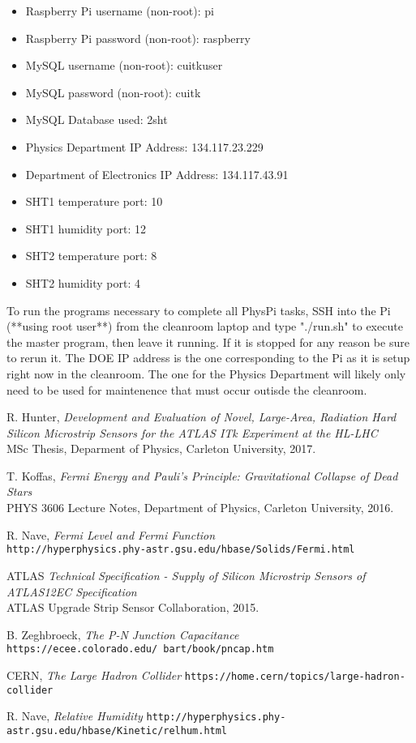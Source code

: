 \documentclass[letterpaper, 11pt]{report}
\begin{document}
\begin{itemize}
\item Raspberry Pi username (non-root): pi
\item Raspberry Pi password (non-root): raspberry
\item MySQL username (non-root): cuitkuser
\item MySQL password (non-root): cuitk
\item MySQL Database used: 2sht
\item Physics Department IP Address: 134.117.23.229
\item Department of Electronics IP Address: 134.117.43.91
\item SHT1 temperature port: 10
\item SHT1 humidity port: 12
\item SHT2 temperature port: 8
\item SHT2 humidity port: 4
\end{itemize}

To run the programs necessary to complete all PhysPi tasks, SSH into the Pi (**using root user**) from the cleanroom laptop and type "./run.sh" to execute the master program, then leave it running.  If it is stopped for any reason be sure to rerun it.  The DOE IP address is the one corresponding to the Pi as it is setup right now in the cleanroom.  The one for the Physics Department will likely only need to be used for maintenence that must occur outisde the cleanroom.

\begin{thebibliography}{9}

R. Hunter,
\textit{Development and Evaluation of Novel, Large-Area, Radiation Hard Silicon Microstrip Sensors for the ATLAS ITk Experiment at the HL-LHC}
\\MSc Thesis, Deparment of Physics, Carleton University, 2017.

T. Koffas,
\textit{Fermi Energy and Pauli's Principle: Gravitational Collapse of Dead Stars}
\\PHYS 3606 Lecture Notes, Department of Physics, Carleton University, 2016.

R. Nave,
\textit{Fermi Level and Fermi Function}
\\\texttt{http://hyperphysics.phy-astr.gsu.edu/hbase/Solids/Fermi.html}

ATLAS
\textit{Technical Specification - Supply of Silicon Microstrip Sensors of ATLAS12EC Specification}
\\ATLAS Upgrade Strip Sensor Collaboration, 2015.

B. Zeghbroeck,
\textit{The P-N Junction Capacitance}
\\\texttt{https://ecee.colorado.edu/~bart/book/pncap.htm}

CERN,
\textit{The Large Hadron Collider}
\texttt{https://home.cern/topics/large-hadron-collider}

R. Nave,
\textit{Relative Humidity}
\texttt{http://hyperphysics.phy-astr.gsu.edu/hbase/Kinetic/relhum.html}



\end{thebibliography}
\end{document}
